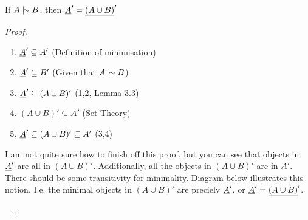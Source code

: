 \documentclass[11pt]{article}
\begin{document}
\begin{lemma}
  If $A \twiddle B$, then $\underline{A}' = \underline{(A \cup B)}'$
\end{lemma}

\begin{proof}

  \begin{enumerate}
    \item $\underline{A}' \subseteq A'$ \hfill (Definition of minimisation)
    \item $\underline{A}' \subseteq B'$ \hfill (Given that $A \twiddle B$)
    \item $\underline{A}' \subseteq (A \cup B)'$ \hfill (1,2, Lemma 3.3)
    \item $(A \cup B)' \subseteq A'$ \hfill (Set Theory)
    \item $\underline{A}' \subseteq (A \cup B)' \subseteq A'$ \hfill (3,4)
  \end{enumerate}
  I am not quite sure how to finish off this proof, but you can see that objects in $\underline{A}'$ are all in $(A\cup B)'$. Additionally, all the objects in $(A\cup B)'$ are in $A'$. There should be some transitivity for minimality. Diagram below illustrates this notion. I.e. the minimal objects in $(A \cup B)'$ are preciely $\underline{A}'$, or $\underline{A}' = \underline{(A\cup B)}'$.
  \begin{center}
  \end{center}
\end{proof}

\end{document}
